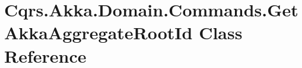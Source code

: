 \hypertarget{classCqrs_1_1Akka_1_1Domain_1_1Commands_1_1GetAkkaAggregateRootId}{}\section{Cqrs.\+Akka.\+Domain.\+Commands.\+Get\+Akka\+Aggregate\+Root\+Id Class Reference}
\label{classCqrs_1_1Akka_1_1Domain_1_1Commands_1_1GetAkkaAggregateRootId}
